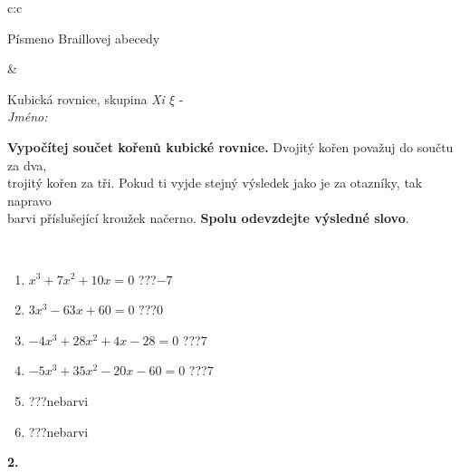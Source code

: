 \documentclass[10pt]{report}
\begin{document}
\begin{tabular}{c:c}
\begin{minipage}[c][104.5mm][t]{0.5\linewidth}
\begin{center}
\begin{minipage}{0.20\linewidth}
\begin{center}
{\small Písmeno Braillovej abecedy}
\end{center}
\end{minipage}
\end{center}
\end{minipage}
&
\begin{minipage}[c][104.5mm][t]{0.5\linewidth}
\begin{center}
\vspace{7mm}
{\huge Kubická rovnice, skupina \textit{Xi $\xi$} -}\\[5mm]
\textit{Jméno:}\phantom{xxxxxxxxxxxxxxxxxxxxxxxxxxxxxxxxxxxxxxxxxxxxxxxxxxxxxxxxxxxxxxxxx}\\[5mm]
\begin{minipage}{0.95\linewidth}
\begin{center}
\textbf{Vypočítej součet kořenů kubické rovnice.} Dvojitý kořen považuj do součtu za dva,\\trojitý kořen za tři. Pokud ti vyjde stejný výsledek jako je za otazníky, tak napravo\\barvi příslušející kroužek načerno. \textbf{Spolu odevzdejte výsledné slovo}.
\end{center}
\end{minipage}
\\[1mm]
\begin{minipage}{0.79\linewidth}
\begin{center}
\begin{varwidth}{\linewidth}
\begin{enumerate}
\Large
\item $x^3+7x^2+10x=0$\quad \dotfill\; ???\;\dotfill \quad $-7$
\item $3x^3-63x+60=0$\quad \dotfill\; ???\;\dotfill \quad $0$
\item $-4x^3+28x^2+4x-28=0$\quad \dotfill\; ???\;\dotfill \quad $7$
\item $-5x^3+35x^2-20x-60=0$\quad \dotfill\; ???\;\dotfill \quad $7$
\item \quad \dotfill\; ???\;\dotfill \quad nebarvi
\item \quad \dotfill\; ???\;\dotfill \quad nebarvi
\end{enumerate}
\end{varwidth}
\end{center}
\end{minipage}
\begin{minipage}{0.20\linewidth}
\begin{center}
{\Huge\bfseries 2.} \\[2mm]

\end{center}
\end{minipage}
\end{center}
\end{minipage}
\end{tabular}
\end{document}
